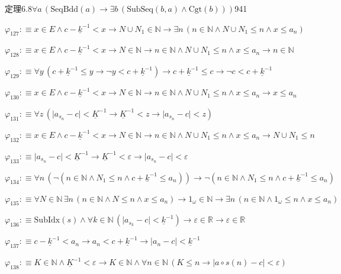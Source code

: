 \begin{fullproof}{定理6.8}{$\forall a\,(\mathrm{SeqBdd}(a) \to \exists b\,(\mathrm{SubSeq}(b,a) \land \mathrm{Cgt}(b)))$}{941}
\begin{abbrevlist}
\item $\varphi_{127} :\equiv x \in E \land c - \underline{k}^{-1} < x \to N \cup N_{1} \in \mathbb{N} \to \exists n\,(n \in \mathbb{N} \land N \cup N_{1} \leq n \land x \leq a_{n})$
\item $\varphi_{128} :\equiv x \in E \land c - \underline{k}^{-1} < x \to N \in \mathbb{N} \to n \in \mathbb{N} \land N \cup N_{1} \leq n \land x \leq a_{n} \to n \in \mathbb{N}$
\item $\varphi_{129} :\equiv \forall y\,(c + \underline{k}^{-1} \leq y \to \neg y < c + \underline{k}^{-1}) \to c + \underline{k}^{-1} \leq c \to \neg c < c + \underline{k}^{-1}$
\item $\varphi_{130} :\equiv x \in E \land c - \underline{k}^{-1} < x \to N \in \mathbb{N} \to n \in \mathbb{N} \land N \cup N_{1} \leq n \land x \leq a_{n} \to x \leq a_{n}$
\item $\varphi_{131} :\equiv \forall z\,(\lvert a_{s_{n}} - c \rvert < \underline{K}^{-1} \to \underline{K}^{-1} < z \to \lvert a_{s_{n}} - c \rvert < z)$
\item $\varphi_{132} :\equiv x \in E \land c - \underline{k}^{-1} < x \to N \in \mathbb{N} \to n \in \mathbb{N} \land N \cup N_{1} \leq n \land x \leq a_{n} \to N \cup N_{1} \leq n$
\item $\varphi_{133} :\equiv \lvert a_{s_{n}} - c \rvert < \underline{K}^{-1} \to \underline{K}^{-1} < \varepsilon \to \lvert a_{s_{n}} - c \rvert < \varepsilon$
\item $\varphi_{134} :\equiv \forall n\,(\neg (n \in \mathbb{N} \land N_{1} \leq n \land c + \underline{k}^{-1} \leq a_{n})) \to \neg (n \in \mathbb{N} \land N_{1} \leq n \land c + \underline{k}^{-1} \leq a_{n})$
\item $\varphi_{135} :\equiv \forall N \in \mathbb{N}\,\exists n\,(n \in \mathbb{N} \land N \leq n \land x \leq a_{n}) \to 1_{\omega} \in \mathbb{N} \to \exists n\,(n \in \mathbb{N} \land 1_{\omega} \leq n \land x \leq a_{n})$
\item $\varphi_{136} :\equiv \mathrm{SubIdx}(s) \land \forall k \in \mathbb{N}\,(\lvert a_{s_{k}} - c \rvert < \underline{k}^{-1}) \to \varepsilon \in \mathbb{R} \to \varepsilon \in \mathbb{R}$
\item $\varphi_{137} :\equiv c - \underline{k}^{-1} < a_{n} \to a_{n} < c + \underline{k}^{-1} \to \lvert a_{n} - c \rvert < \underline{k}^{-1}$
\item $\varphi_{138} :\equiv K \in \mathbb{N} \land \underline{K}^{-1} < \varepsilon \to K \in \mathbb{N} \land \forall n \in \mathbb{N}\,(K \leq n \to \lvert a \circ s(n) - c \rvert < \varepsilon)$

\end{abbrevlist}
\end{fullproof}

